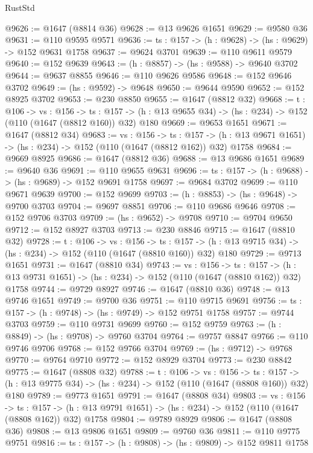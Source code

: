 \begin{lexlean}{RustStd}
\begin{coremodule}
@9626 := @1647 (@8814 @36)
@9628 := @13 @9626 @1651
@9629 := @9580 @36
@9631 := @110 @9595 @9571
@9636 := {ts : @157} -> (h : @9628) -> (hs : @9629) -> @152 @9631 @1758
@9637 := @9624 @3701
@9639 := @110 @9611 @9579
@9640 := @152 @9639
@9643 := (h : @8857) -> (hs : @9588) -> @9640 @3702
@9644 := @9637 @8855
@9646 := @110 @9626 @9586
@9648 := @152 @9646 @3702
@9649 := (hs : @9592) -> @9648
@9650 := @9644 @9590
@9652 := @152 @8925 @3702
@9653 := @230 @8850
@9655 := @1647 (@8812 @32)
@9668 := {t : @106} ->
  {vs : @156} ->
  {ts : @157} -> (h : @13 @9655 @34) -> (hs : @234) -> @152 (@110 (@1647 (@8812 @160)) @32) @180
@9669 := @9653 @1651
@9671 := @1647 (@8812 @34)
@9683 := {vs : @156} ->
  {ts : @157} -> (h : @13 @9671 @1651) -> (hs : @234) -> @152 (@110 (@1647 (@8812 @162)) @32) @1758
@9684 := @9669 @8925
@9686 := @1647 (@8812 @36)
@9688 := @13 @9686 @1651
@9689 := @9640 @36
@9691 := @110 @9655 @9631
@9696 := {ts : @157} -> (h : @9688) -> (hs : @9689) -> @152 @9691 @1758
@9697 := @9684 @3702
@9699 := @110 @9671 @9639
@9700 := @152 @9699
@9703 := (h : @8853) -> (hs : @9648) -> @9700 @3703
@9704 := @9697 @8851
@9706 := @110 @9686 @9646
@9708 := @152 @9706 @3703
@9709 := (hs : @9652) -> @9708
@9710 := @9704 @9650
@9712 := @152 @8927 @3703
@9713 := @230 @8846
@9715 := @1647 (@8810 @32)
@9728 := {t : @106} ->
  {vs : @156} ->
  {ts : @157} -> (h : @13 @9715 @34) -> (hs : @234) -> @152 (@110 (@1647 (@8810 @160)) @32) @180
@9729 := @9713 @1651
@9731 := @1647 (@8810 @34)
@9743 := {vs : @156} ->
  {ts : @157} -> (h : @13 @9731 @1651) -> (hs : @234) -> @152 (@110 (@1647 (@8810 @162)) @32) @1758
@9744 := @9729 @8927
@9746 := @1647 (@8810 @36)
@9748 := @13 @9746 @1651
@9749 := @9700 @36
@9751 := @110 @9715 @9691
@9756 := {ts : @157} -> (h : @9748) -> (hs : @9749) -> @152 @9751 @1758
@9757 := @9744 @3703
@9759 := @110 @9731 @9699
@9760 := @152 @9759
@9763 := (h : @8849) -> (hs : @9708) -> @9760 @3704
@9764 := @9757 @8847
@9766 := @110 @9746 @9706
@9768 := @152 @9766 @3704
@9769 := (hs : @9712) -> @9768
@9770 := @9764 @9710
@9772 := @152 @8929 @3704
@9773 := @230 @8842
@9775 := @1647 (@8808 @32)
@9788 := {t : @106} ->
  {vs : @156} ->
  {ts : @157} -> (h : @13 @9775 @34) -> (hs : @234) -> @152 (@110 (@1647 (@8808 @160)) @32) @180
@9789 := @9773 @1651
@9791 := @1647 (@8808 @34)
@9803 := {vs : @156} ->
  {ts : @157} -> (h : @13 @9791 @1651) -> (hs : @234) -> @152 (@110 (@1647 (@8808 @162)) @32) @1758
@9804 := @9789 @8929
@9806 := @1647 (@8808 @36)
@9808 := @13 @9806 @1651
@9809 := @9760 @36
@9811 := @110 @9775 @9751
@9816 := {ts : @157} -> (h : @9808) -> (hs : @9809) -> @152 @9811 @1758

\end{coremodule}
\end{lexlean}
